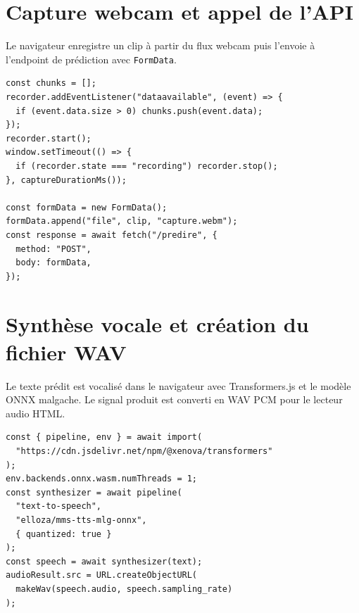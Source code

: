\section{Capture webcam et appel de l'API}

Le navigateur enregistre un clip à partir du flux webcam puis l'envoie à
l'endpoint de prédiction avec \texttt{FormData}.

\begin{verbatim}
const chunks = [];
recorder.addEventListener("dataavailable", (event) => {
  if (event.data.size > 0) chunks.push(event.data);
});
recorder.start();
window.setTimeout(() => {
  if (recorder.state === "recording") recorder.stop();
}, captureDurationMs());

const formData = new FormData();
formData.append("file", clip, "capture.webm");
const response = await fetch("/predire", {
  method: "POST",
  body: formData,
});
\end{verbatim}

\section{Synthèse vocale et création du fichier WAV}

Le texte prédit est vocalisé dans le navigateur avec Transformers.js et le
modèle ONNX malgache. Le signal produit est converti en WAV PCM pour le lecteur
audio HTML.

\begin{verbatim}
const { pipeline, env } = await import(
  "https://cdn.jsdelivr.net/npm/@xenova/transformers"
);
env.backends.onnx.wasm.numThreads = 1;
const synthesizer = await pipeline(
  "text-to-speech",
  "elloza/mms-tts-mlg-onnx",
  { quantized: true }
);
const speech = await synthesizer(text);
audioResult.src = URL.createObjectURL(
  makeWav(speech.audio, speech.sampling_rate)
);
\end{verbatim}

\endinput

